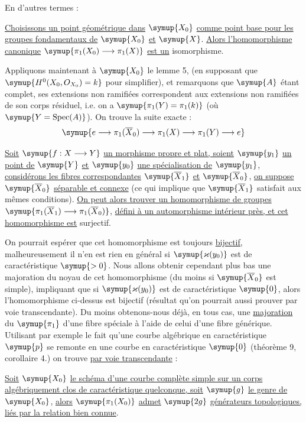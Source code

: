 En d'autres termes :

 \uline{Choisissons un point géométrique dans} $\symup{X_0}$ \uline{comme point
base pour les groupes fondamentaux de} $\symup{X_0}$ \uline{et} $\symup{X}$. \uline{Alors l'homomorphisme
canonique} $\symup{\pi_1(X_0)\longrightarrow\pi_1(X)}$ \uline{est un} isomorphisme.

Appliquons maintenant à $\symup{X_0}$ le lemme 5, (en supposant que
$\symup{H^0(X_0,O_{X_0})=k}$ pour simplifier), et remarquons que $\symup{A}$ étant complet,
ses extensions non ramifiées correspondent aux extensions non ramifiées de son
corps résiduel, i.e. on a $\symup{\pi_1(Y)=\pi_1(k)}$ (où
$\symup{Y=\operatorname{Spec}(A)}$). On trouve la suite exacte :
\[
  \symup{e\longrightarrow\pi_1(\overline X_0)
  \longrightarrow\pi_1(X)\longrightarrow\pi_1(Y)\longrightarrow e}
\]

 \uline{Soit} $\symup{f:X\longrightarrow Y}$ \uline{un morphisme propre et
plat, soient} $\symup{y_1}$ \uline{un point de} $\symup{Y}$ \uline{et} $\symup{y_0}$ \uline{une spécialisation de} $\symup{y_1}$,
\uline{considérons les fibres  correspondantes}
$\symup{\overline X_1}$ \uline{et} $\symup{\overline X_0}$, \uline{on suppose} $\symup{\overline X_0}$ \uline{séparable et
connexe} (ce qui implique que $\symup{\overline X_1}$ satisfait aux mêmes conditions).
\uline{On peut alors trouver un homomorphisme de groupes}
$\symup{\pi_1(\overline X_1)\longrightarrow\pi_1(\overline X_0)}$, \uline{défini à un
automorphisme intérieur près, et cet homomorphisme est} surjectif.

On pourrait espérer que cet homomorphisme est toujours \uline{bijectif,}
malheureusement il n'en est rien en général si $\symup{\varkappa(y_0)}$ est de
caractéristique $\symup{>0}$. Nous allons obtenir cependant plus bas une majoration du
noyau de cet homomorphisme (du moins si $\symup{\overline X_0}$ est simple), impliquant
que si $\symup{\varkappa(y_0)}$ est de caractéristique $\symup{0}$, alors l'homomorphisme
ci-dessus est bijectif (résultat qu'on pourrait aussi prouver par voie
transcendante). Du moins obtenons-nous déjà, en tous cas, une \uline{majoration} du
$\symup{\pi_1}$ d'une fibre spéciale à l'aide de celui d'une fibre générique. Utilisant
par exemple le fait qu'une courbe algébrique en caractéristique $\symup{p}$ se remonte
en une courbe en caractéristique $\symup{0}$ (théorème 9, corollaire 4.) on trouve \uline{par
voie transcendante} :

 \uline{Soit} $\symup{X_0}$ \uline{le schéma d'une courbe complète simple sur
un corps algébriquement clos de caractéristique quelconque, soit} $\symup{g}$ \uline{le genre
de} $\symup{X_0}$, \uline{alors} $\symup{\pi_1(X_0)}$ \uline{admet} $\symup{2g}$ \uline{générateurs topologiques, liés par la
relation bien connue}.

